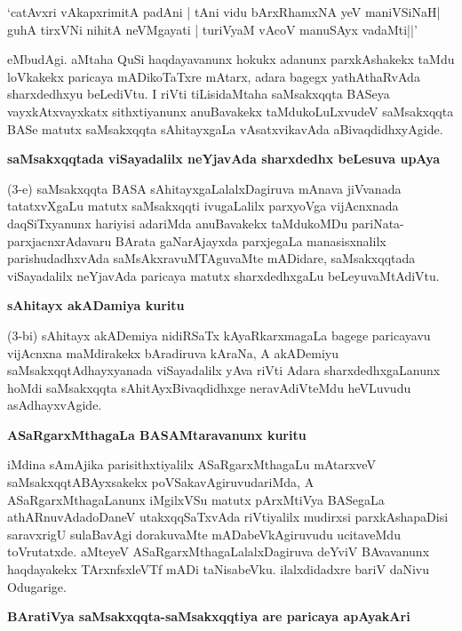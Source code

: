 \smallskip
\begin{shloka}
`catAvxri vAkapxrimitA padAni | tAni vidu bArxRhamxNA yeV maniVSiNaH|\\\label{31}
guhA tirxVNi nihitA neVMgayati | turiVyaM vAcoV manuSAyx vadaMti||'
\end{shloka}
\smallskip

eMbudAgi. aMtaha QuSi haqdayavanunx hokukx adanunx parxkAshakekx taMdu loVkakekx paricaya mADi\-koTaTxre mAtarx, adara bagegx yathAthaRvAda sharxdedhxyu beLediVtu. I riVti tiLisidaMtaha saMsakxqqta BASeya vayxkAtxvayxkatx sithxtiyanunx anuBavakekx taMdukoLuLxvudeV saMsakxqqta BASe matutx saMsakxqqta sAhitayxgaLa vAsatxvikavAda aBivaqdidhxyAgide.

\newpage

{\bigskip
\noindent
{\large\bf saMsakxqqtada viSayadalilx neYjavAda sharxdedhx beLesuva upAya}}\label{page31}
\medskip

\noindent
(3-e) saMsakxqqta BASA sAhitayxgaLalalxDagiruva mAnava jiVvanada tatatxvXgaLu matutx saMsakxqqti ivu\-gaLalilx parxyoVga vijAcnxnada daqSiTxyanunx hariyisi adariMda anuBavakekx taMdukoMDu pariNata-parxjacnx\-rAdavaru BArata gaNarAjayxda parxjegaLa manasisxnalilx pari\-shudadhxvAda saMsAkxravuMTAguvaMte mADi\-dare, saMsakxqqtada viSayadalilx neYjavAda paricaya matutx sharxdedhxgaLu beLeyuvaMtAdiVtu.

{\bigskip
\noindent
{\large\bf sAhitayx akADamiya kuritu}}\label{page32}
\medskip

\noindent
(3-bi) sAhitayx akADemiya nidiRSaTx kAyaRkarxmagaLa bagege paricayavu vijAcnxna maMdirakekx bAra\-diruva kAraNa, A akADemiyu saMsakxqqtAdhayxyanada viSayadalilx yAva riVti Adara sharxdedhxgaLanunx hoMdi saMsakxqqta sAhitAyxBivaqdidhxge neravAdiVteMdu heVLuvudu asAdhayxvAgide.

{\bigskip
\noindent
{\large\bf ASaRgarxMthagaLa BASAMtaravanunx kuritu}}
\medskip

\noindent
iMdina sAmAjika parisithxtiyalilx ASaRgarxMthagaLu mAtarxveV saMsakxqqtABAyxsakekx poVSakavAgiruvuda\-riMda, A ASaRgarxMthagaLanunx iMgilxVSu matutx pArxMtiVya BASegaLa athARnuvAdadoDaneV utakxqqSaTx\-vAda riVti\-yalilx mudirxsi parxkAshapaDisi saravxrigU sulaBavAgi dorakuvaMte mADabeVkAgiruvudu ucita\-veMdu toVru\-tatxde. aMteyeV ASaRgarxMthagaLalalxDagiruva deYviV BAvavanunx haqdayakekx TArxnfsxleVTf mADi taNisa\-beVku. ilalxdidadxre bariV daNivu Odugarige. 

{\bigskip
\noindent
{\large\bf BAratiVya saMsakxqqta-saMsakxqqtiya are paricaya apAyakAri}}\label{page32}
\medskip

